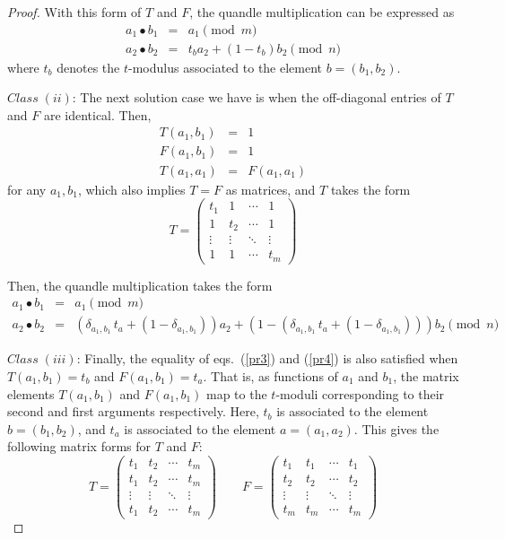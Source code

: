 \documentclass[a4paper,12pt]{article}
\begin{document}
\begin{proof}
With this form of $T$ and $F$, the quandle multiplication can be expressed as
\begin{eqnarray}
    a_1 \bullet b_1 &=& a_1 \pmod{m}  \label{op1} \\
    a_2 \bullet b_2 &=& t_{b} a_2 + (1 - t_{b}) b_2 \pmod{n}   \label{op2} 
\end{eqnarray}
where $t_{b}$ denotes the $t$-modulus associated to the element $b = (b_1, b_2)$. 


$Class \; (ii)$: The next solution case we have is when the off-diagonal entries of $T$ and $F$ are identical. Then, 
\begin{eqnarray}
T(a_1, b_1) &=& 1   \nonumber \\
F(a_1, b_1) &=& 1   \nonumber \\
T(a_1, a_1) &=& F(a_1, a_1)   \nonumber 
\end{eqnarray}
for any $a_1, b_1$, which also implies $T = F$ as matrices, and $T$ takes the form
\[ T =  \begin{pmatrix}
    t_{1} & 1 & \cdots & 1 \\
    1 & t_{2} & \cdots & 1 \\
    \vdots & \vdots & \ddots & \vdots \\
    1 & 1 & \cdots & t_{m}
\end{pmatrix}    \]

Then, the quandle multiplication takes the form 
\begin{eqnarray}
    a_1 \bullet b_1 &=& a_1 \pmod{m}    \\
    a_2 \bullet b_2 &=& \left( \delta_{ a_1, b_1 } \, t_a + (1 - \delta_{ a_1, b_1 }) \right) a_2 + (1 - \left( \delta_{ a_1, b_1 } \, t_a + (1 - \delta_{ a_1, b_1 }) \right) ) b_2 \pmod{n}     
\end{eqnarray}



$Class \; (iii)$:  Finally, the equality of eqs.~(\ref{pr3}) and (\ref{pr4}) is also satisfied when $T(a_1, b_1) = t_b$ and $F(a_1, b_1) = t_a$. That is, as functions of $a_1$ and $b_1$, the matrix elements $T(a_1, b_1)$ and $F(a_1, b_1)$ map to the $t$-moduli corresponding to their second and first arguments respectively. Here, $t_{b}$ is associated to the element $b = (b_1, b_2)$, and $t_{a}$ is associated to the element $a = (a_1, a_2)$.  This gives the following matrix forms for $T$ and $F$: 
\[ T =  \begin{pmatrix}
    t_{1} & t_{2} & \cdots & t_{m} \\
    t_{1} & t_{2} & \cdots & t_{m} \\
    \vdots & \vdots & \ddots & \vdots \\
    t_{1} & t_{2} & \cdots & t_{m}
\end{pmatrix}     \quad  \quad 
F =  \begin{pmatrix}
    t_{1} & t_{1} & \cdots & t_{1} \\
    t_{2} & t_{2} & \cdots & t_{2} \\
    \vdots & \vdots & \ddots & \vdots \\
    t_{m} & t_{m} & \cdots & t_{m}
\end{pmatrix}    
\]


\end{proof}
\end{document}
